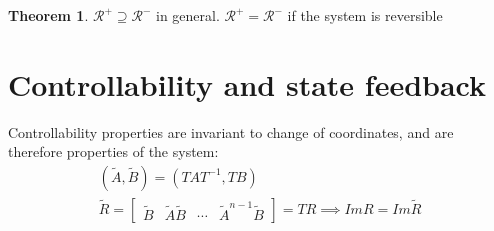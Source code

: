 \documentclass{book}
\theoremstyle{definition}
\newtheorem{theorem}{Theorem}[section]
\theoremstyle{remark}
\theoremstyle{remark}
\begin{document}
\begin{theorem}
    \( \mathcal{R}^+ \supseteq \mathcal{R}^- \) in general. \(\mathcal{R}^+ = \mathcal{R}^-\) if the system is reversible
\end{theorem}

\section{Controllability and state feedback}
Controllability properties are invariant to change of coordinates, and are therefore properties of the system:\\
\begin{gather*}
    (\tilde{A}, \tilde{B})=(TAT^{-1},TB)\\
    \tilde{R}=\begin{bmatrix}
        \tilde{B} & \tilde{A}\tilde{B} & \cdots & \tilde{A}^{n-1}\tilde{B}
    \end{bmatrix}=TR \implies ImR=Im\tilde{R}
\end{gather*}
\end{document}
